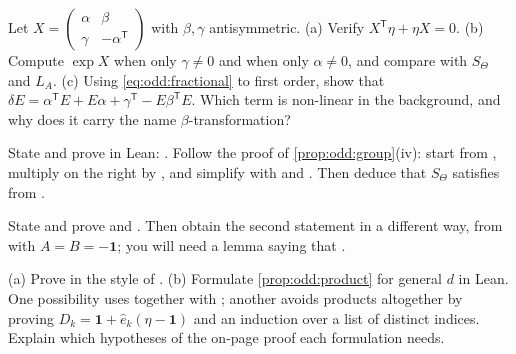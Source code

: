 \begin{exercise}\label{ex:odd:lie}
Let $X=\left(\begin{smallmatrix}\alpha&\beta\\ \gamma&-\alpha^{\mathsf T}
\end{smallmatrix}\right)$ with $\beta,\gamma$ antisymmetric. (a) Verify
$X^{\mathsf T}\eta+\eta X=0$. (b) Compute $\exp X$ when only $\gamma\neq0$ and when only
$\alpha\neq0$, and compare with $S_\Theta$ and $L_A$. (c) Using
\eqref{eq:odd:fractional} to first order, show that
$\delta E=\alpha^{\mathsf T}E+E\alpha+\gamma^{\mathsf T}-E\beta^{\mathsf T}E$. Which term
is non-linear in the background, and why does it carry the name
$\beta$-transformation?
\end{exercise}

\begin{exercise}\label{ex:odd:leantranspose}
State and prove in Lean: . Follow the proof of \cref{prop:odd:group}(iv): start from
, multiply on the right by , and simplify with
 and . Then deduce that $S_\Theta$ satisfies
 from .
\end{exercise}

\begin{exercise}\label{ex:odd:leansmall}
State and prove  and
. Then obtain the second statement in a
different way, from  with $A=B=-\mathbf 1$; you will need a lemma
saying that .
\end{exercise}

\begin{exercise}\label{ex:odd:leanproduct}
(a) Prove  in the style
of . (b) Formulate \cref{prop:odd:product} for general $d$ in Lean.
One possibility uses  together with ;
another avoids products altogether by proving
$D_k=\mathbf 1+\hat e_k(\eta-\mathbf 1)$ and an induction over a list of distinct indices.
Explain which hypotheses of the on-page proof each formulation needs.
\end{exercise}

